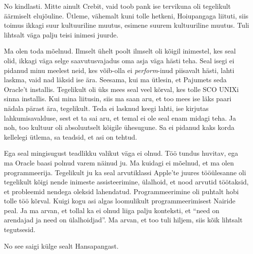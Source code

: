 
No kindlasti. Mitte ainult Crebit, vaid toob pank ise tervikuna oli tegelikult 
äärmiselt elujõuline. Ütleme, vähemalt kuni tolle hetkeni, 
Hoiupangaga liituti, siis toimus ikkagi suur kultuuriline 
muutus, esimene suurem kultuuriline muutus. Tuli lihtsalt väga palju teisi 
inimesi juurde.


Ma olen toda mõelnud. Ilmselt ühelt poolt ilmselt oli kõigil inimestel, kes 
seal olid, ikkagi väga selge saavutusvajadus oma asja väga hästi teha. Seal 
isegi ei pidanud minu meelest neid, kes võib-olla ei \emph{perform}-inud 
piisavalt hästi, lahti laskma, vaid nad läksid ise ära. Seesama, kui ma 
ütlesin, et Pajumets seda Oracle't installis. 
Tegelikult oli üks mees seal veel kõrval, kes tolle SCO UNIXi sinna installis. 
Kui mina liitusin, siis ma saan aru, et too mees ise läks paari nädala pärast 
ära, tegelikult. Teda ei lasknud keegi lahti, ise kirjutas lahkumisavalduse, 
sest et ta sai aru, et temal ei ole seal enam midagi teha. Ja noh, too kultuur 
oli absoluutselt kõigile ühesugune. Sa ei pidanud kaks korda kellelegi ütlema, 
sa teadsid, et asi on tehtud.


Ega seal mingisugust  teadlikku valikut väga ei olnud. Töö tundus huvitav, ega 
ma Oracle baasi polnud varem näinud ju. Ma kuidagi ei mõelnud, et ma olen 
programmeerija. Tegelikult ju ka seal arvutiklassi Apple'te juures  tööülesanne 
oli tegelikult kõigi nende inimeste assisteerimine, ülalhoid, et nood arvutid 
töötaksid, et probleemid nendega oleksid lahendatud. Programmeerimine oli 
puhtalt hobi tolle töö kõrval. Kuigi kogu asi algas loomulikult 
programmeerimisest Nairide peal. Ja ma arvan, et tollal ka ei olnud liiga palju 
konteksti, et \enquote{need on arendajad ja need on ülalhoidjad}. Ma arvan, et 
too tuli hiljem, siis kõik lihtsalt tegutsesid.


No see saigi külge sealt Hansapangast. 

